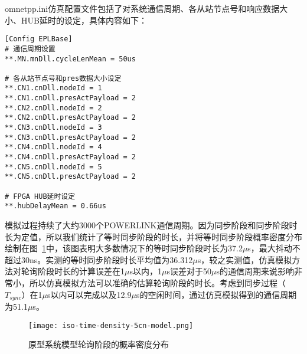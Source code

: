 omnetpp.ini仿真配置文件包括了对系统通信周期、各从站节点号和响应数据大小、HUB延时的设定，具体内容如下：

\begin{lstlisting}
[Config EPLBase]
# 通信周期设置
**.MN.mnDll.cycleLenMean = 50us

# 各从站节点号和pres数据大小设定
**.CN1.cnDll.nodeId = 1
**.CN1.cnDll.presActPayload = 2
**.CN2.cnDll.nodeId = 2
**.CN2.cnDll.presActPayload = 2
**.CN3.cnDll.nodeId = 3
**.CN3.cnDll.presActPayload = 2
**.CN4.cnDll.nodeId = 4
**.CN4.cnDll.presActPayload = 2
**.CN5.cnDll.nodeId = 5
**.CN5.cnDll.presActPayload = 2

# FPGA HUB延时设定
**.hubDelayMean = 0.66us
\end{lstlisting}

模拟过程持续了大约3000个POWERLINK通信周期。因为同步阶段和同步阶段时长为定值，所以我们统计了等时同步阶段的时长，并将等时同步阶段概率密度分布绘制在图~\ref{fig:iso-time-density-5cn-model}中，该图表明大多数情况下的等时同步阶段时长为37.2$\mu$s，最大抖动不超过30ns。实测的等时同步阶段时长平均值为36.312$\mu$s，较之实测值，仿真模拟方法对轮询阶段时长的计算误差在1$\mu$s以内，1$\mu$s误差对于50$\mu$s的通信周期来说影响非常小，所以仿真模拟方法可以准确的估算轮询阶段的时长。考虑到同步过程（$T_{sync}$）在1$\mu$s以内可以完成以及12.9$\mu$s的空闲时间，通过仿真模拟得到的通信周期为51.1$\mu$s。

\begin{figure}[!htb]
  \centering
  \texttt{[image: iso-time-density-5cn-model.png]}
  \caption{原型系统模型轮询阶段的概率密度分布}
  \label{fig:iso-time-density-5cn-model}
\end{figure}








